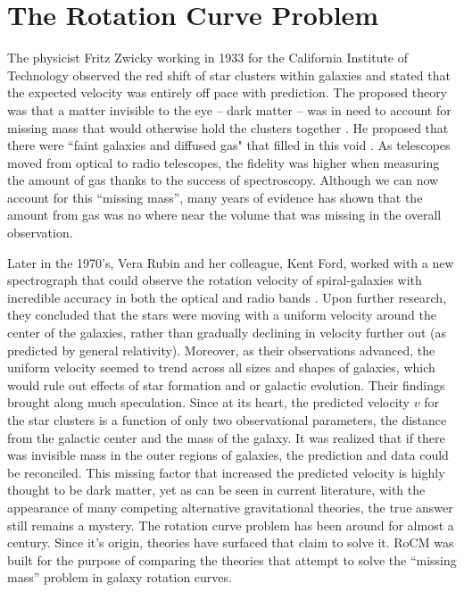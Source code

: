 \documentclass[conference]{IEEEtran-modified}
\begin{document}
\section{The Rotation Curve Problem}
The physicist Fritz Zwicky working in 1933 for the California Institute of Technology observed the red shift of star clusters within galaxies and stated that the expected velocity was entirely off pace with prediction. The proposed theory was that a matter invisible to the eye -- dark matter -- was in need to account for missing mass that would otherwise hold the clusters together \cite{zwicky}. He proposed that there were ``faint galaxies and diffused gas" that filled in this void \cite{zwicky}.  As telescopes moved from optical to radio telescopes, the fidelity was higher when measuring the amount of gas thanks to the success of spectroscopy.  Although we can now account for this ``missing mass'', many years of evidence has shown that the amount from gas was no where near the volume that was missing in the overall observation. 

Later in the 1970's, Vera Rubin and her colleague, Kent Ford, worked with a new spectrograph that could observe the rotation velocity of spiral-galaxies with incredible accuracy in both the optical and radio bands \cite{rubin1980}. Upon further research, they concluded that the stars were moving with a uniform velocity around the center of the galaxies, rather than gradually declining in velocity further out (as predicted by general relativity).  Moreover, as their observations advanced, the uniform velocity seemed to trend across all sizes and shapes of galaxies, which would rule out effects of star formation and or galactic evolution. Their findings brought along much speculation.  Since at its heart, the predicted velocity $v$ for the star clusters is a function of only two observational parameters, the distance from the galactic center and the mass of the galaxy. It was realized that if there was invisible mass in the outer regions of galaxies, the prediction and data could be reconciled. This missing factor that increased the predicted velocity is highly thought to be dark matter, yet as can be seen in current literature, with the appearance of many competing alternative gravitational theories, the true answer still remains a mystery.
The rotation curve problem has been around for almost a century. Since it's origin, theories have surfaced that claim to solve it. RoCM was built for the purpose of comparing the theories that attempt to solve the ``missing mass'' problem in galaxy rotation curves.
\end{document}
